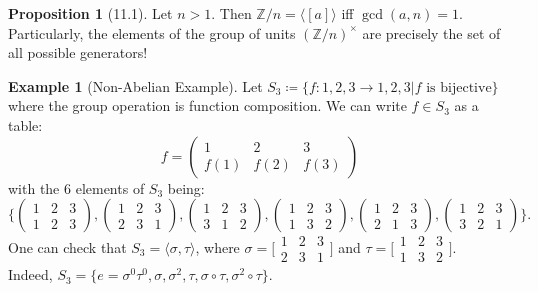 \documentclass{article}
\newcommand{\Z}{\mathbb{Z}}
\newcommand{\coleq}{\coloneqq}
\newcommand{\func}[3]{#1: #2 \to #3}
\newcommand{\Znx}{(\mathbb{Z}/n)^\times}
\newcommand{\gen}[1]{\langle#1\rangle}
\theoremstyle{definition}
\newtheorem*{prop}{Proposition}
\newtheorem*{ex}{Example}
\theoremstyle{remark}
\begin{document}
{{            \begin{prop}[11.1]
                Let $n>1$. Then $\Z/n= \gen{[a]}$ iff $\gcd(a,n)=1$. Particularly, the elements of the group of units $\Znx$ are precisely the set of all possible generators!
            \end{prop}
        }
        \begin{ex}[Non-Abelian Example]
            Let $S_3 \coleq \{\func{f}{1,2,3}{1,2,3}|f \text{ is bijective}\}$ where the group operation is function composition. We can write $f \in S_3$ as a table:
                \[f=\begin{pmatrix}
                    1&2&3\\
                    f(1)&f(2)&f(3)
                \end{pmatrix}\]
            with the 6 elements of $S_3$ being:
                \[\Bigg\{\begin{pmatrix}
                    1&2&3\\
                    1&2&3
                \end{pmatrix},
                \begin{pmatrix}
                    1&2&3\\
                    2&3&1
                \end{pmatrix},
                \begin{pmatrix}
                    1&2&3\\
                    3&1&2
                \end{pmatrix},
                \begin{pmatrix}
                    1&2&3\\
                    1&3&2
                \end{pmatrix},
                \begin{pmatrix}
                    1&2&3\\
                    2&1&3
                \end{pmatrix},
                \begin{pmatrix}
                    1&2&3\\
                    3&2&1
                \end{pmatrix}\Bigg\}.\]
            One can check that $S_3=\gen{\sigma,\tau}$, where $\sigma=\big[\begin{smallmatrix}1&2&3\\2&3&1\end{smallmatrix}\big]$ and $\tau=\big[\begin{smallmatrix}1&2&3\\1&3&2\end{smallmatrix}\big]$.\\
            Indeed, $S_3=\{e=\sigma^0\tau^0,\sigma,\sigma^2,\tau,\sigma\circ\tau, \sigma^2\circ\tau\}$.
        \end{ex}
        
}
\end{document}
